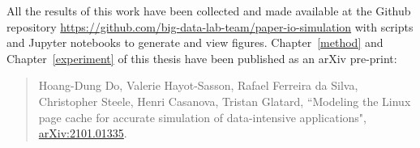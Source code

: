 All the results of this work have been collected and made available at the Github repository 
\url{https://github.com/big-data-lab-team/paper-io-simulation} 
with scripts and Jupyter notebooks to generate and view figures. 
Chapter~\ref{method} and Chapter~\ref{experiment} of this thesis have been 
published as an arXiv pre-print:

\begin{quote}
    Hoang-Dung Do, Valerie Hayot-Sasson, Rafael Ferreira da Silva,
    Christopher Steele, Henri Casanova, Tristan Glatard, ``Modeling the
    Linux page cache for accurate simulation of data-intensive
    applications", \href{https://arxiv.org/abs/2101.01335}{arXiv:2101.01335}. 
\end{quote}